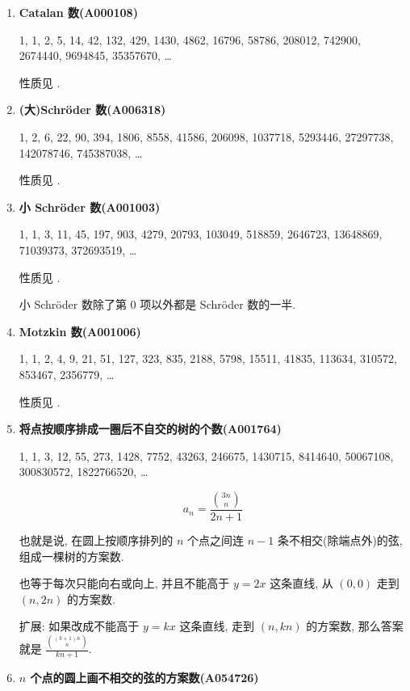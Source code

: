\begin{enumerate}
    \item \textbf{Catalan 数(A000108)}

          1, 1, 2, 5, 14, 42, 132, 429, 1430, 4862, 16796, 58786, 208012, 742900, 2674440, 9694845, 35357670, \dots

          性质见 .

    \item \textbf{(大)Schr\"oder 数(A006318)}

          1, 2, 6, 22, 90, 394, 1806, 8558, 41586, 206098, 1037718, 5293446, 27297738, 142078746, 745387038, \dots

          性质见 .

    \item \textbf{小 Schr\"oder 数(A001003)}

          1, 1, 3, 11, 45, 197, 903, 4279, 20793, 103049, 518859, 2646723, 13648869, 71039373, 372693519, \dots

          性质见 .

          小 Schr\"oder 数除了第 \(0\) 项以外都是 Schr\"oder 数的一半.

    \item \textbf{Motzkin 数(A001006)}

          1, 1, 2, 4, 9, 21, 51, 127, 323, 835, 2188, 5798, 15511, 41835, 113634, 310572, 853467, 2356779, \dots

          性质见 .

    \item \textbf{将点按顺序排成一圈后不自交的树的个数(A001764)}

          1, 1, 3, 12, 55, 273, 1428, 7752, 43263, 246675, 1430715, 8414640, 50067108, 300830572, 1822766520, \dots

          \[
              a_n = \frac {{3n \choose n}} {2n + 1}
          \]

          也就是说, 在圆上按顺序排列的 \(n\) 个点之间连 \(n - 1\) 条不相交(除端点外)的弦, 组成一棵树的方案数.

          也等于每次只能向右或向上, 并且不能高于 \(y = 2x\) 这条直线, 从 \((0, 0)\) 走到 \((n, 2n)\) 的方案数.

          扩展: 如果改成不能高于 \(y = kx\) 这条直线, 走到 \((n, kn)\) 的方案数, 那么答案就是 \( \frac {{(k + 1)n \choose n}} {kn + 1} \).

    \item \textbf{\(n\) 个点的圆上画不相交的弦的方案数(A054726)}


\end{enumerate}
